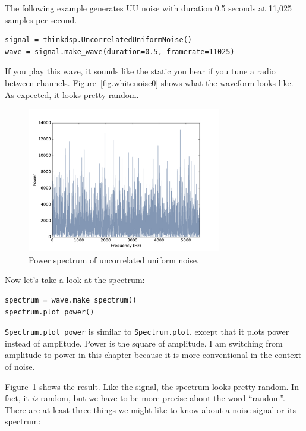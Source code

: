 \documentclass[12pt]{book}
\begin{document}
The following example generates UU noise with duration 0.5
seconds at 11,025 samples per second.

\begin{verbatim}
signal = thinkdsp.UncorrelatedUniformNoise()
wave = signal.make_wave(duration=0.5, framerate=11025)
\end{verbatim}

If you play this wave, it sounds like the static you hear if you tune
a radio between channels.  Figure~\ref{fig.whitenoise0} shows what the
waveform looks like.  As expected, it looks pretty random.

\begin{figure}
\centerline{\includegraphics[height=2.5in]{figs/whitenoise1.pdf}}
\caption{Power spectrum of uncorrelated uniform noise.}
\label{fig.whitenoise1}
\end{figure}

Now let's take a look at the spectrum:

\begin{verbatim}
spectrum = wave.make_spectrum()
spectrum.plot_power()
\end{verbatim}

\verb"Spectrum.plot_power" is similar to \verb"Spectrum.plot",
except that it plots power instead of amplitude.
Power is the square of amplitude.
I am switching from amplitude to power in this chapter because
it is more conventional in the context of noise.

Figure~\ref{fig.whitenoise1} shows the result.  Like the signal, the
spectrum looks pretty random.  In fact, it {\em is} random, but we have to
be more precise about the word ``random''.  There are at least three
things we might like to know about a noise signal or its spectrum:
\end{document}
